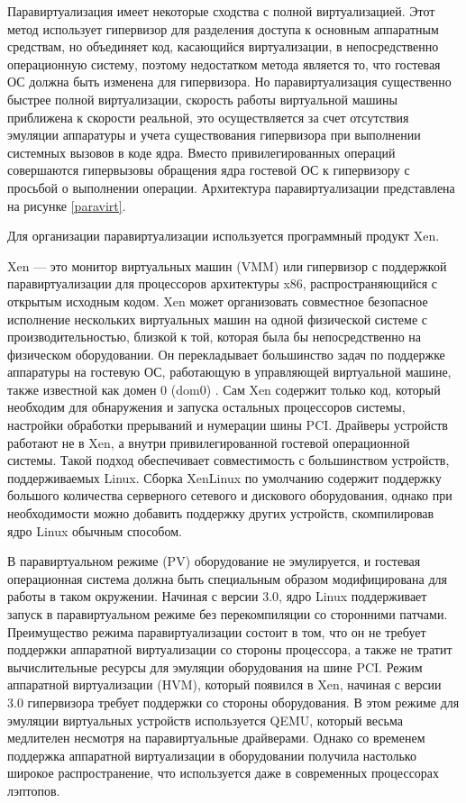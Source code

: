 Паравиртуализация имеет некоторые сходства с полной виртуализацией.
Этот метод использует гипервизор для разделения доступа к основным аппаратным средствам, но объединяет код, касающийся виртуализации, в непосредственно операционную систему, поэтому недостатком метода является то, что гостевая ОС должна быть изменена для гипервизора.
Но паравиртуализация существенно быстрее полной виртуализации, скорость работы виртуальной машины приближена к скорости реальной, это осуществляется за счет отсутствия эмуляции аппаратуры и учета существования гипервизора при выполнении системных вызовов в коде ядра.
Вместо привилегированных операций совершаются гипервызовы обращения ядра гостевой ОС к гипервизору с просьбой о выполнении операции.
Архитектура паравиртуализации представлена на рисунке \ref{paravirt}.

Для организации паравиртуализации используется программный продукт Xen.

Xen --- это монитор виртуальных машин (VMM) или гипервизор с поддержкой паравиртуализации для процессоров архитектуры x86, распространяющийся с открытым исходным кодом.
Xen может организовать совместное безопасное исполнение нескольких виртуальных машин на одной физической системе с производительностью, близкой к той, которая была бы непосредственно на физическом оборудовании.
Он перекладывает большинство задач по поддержке аппаратуры на гостевую ОС, работающую в управляющей виртуальной машине, также известной как домен 0 (dom0) \cite{xen-xguru}.
Сам Xen содержит только код, который необходим для обнаружения и запуска остальных процессоров системы, настройки обработки прерываний и нумерации шины PCI.
Драйверы устройств работают не в Xen, а внутри привилегированной гостевой операционной системы.
Такой подход обеспечивает совместимость с большинством устройств, поддерживаемых Linux.
Сборка XenLinux по умолчанию содержит поддержку большого количества серверного сетевого и дискового оборудования, однако при необходимости можно добавить поддержку других устройств, скомпилировав ядро Linux обычным способом.

В паравиртуальном режиме (PV) оборудование не эмулируется, и гостевая операционная система должна быть специальным образом модифицирована для работы в таком окружении.
Начиная с версии 3.0, ядро Linux поддерживает запуск в паравиртуальном режиме без перекомпиляции со сторонними патчами.
Преимущество режима паравиртуализации состоит в том, что он не требует поддержки аппаратной виртуализации со стороны процессора, а также не тратит вычислительные ресурсы для эмуляции оборудования на шине PCI.
Режим аппаратной виртуализации (HVM), который появился в Xen, начиная с версии 3.0 гипервизора требует поддержки со стороны оборудования.
В этом режиме для эмуляции виртуальных устройств используется QEMU, который весьма медлителен несмотря на паравиртуальные драйверами.
Однако со временем поддержка аппаратной виртуализации в оборудовании получила настолько широкое распространение, что используется даже в современных процессорах лэптопов.

